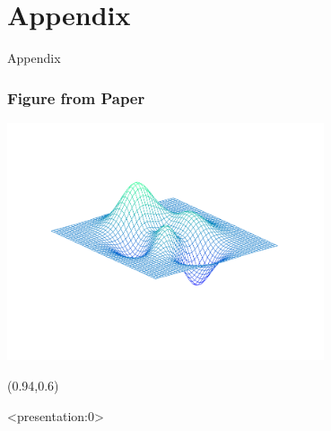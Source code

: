\documentclass[12pt,aspectratio=169,xcolor=dvipsnames,hyperref={colorlinks=true,linkcolor=blue,citecolor=black}]{beamer}
\begin{document}
\section[]{Appendix}

\begin{frame}
	\begin{center}
		\huge \textcolor{yaleblue}{Appendix}
	\end{center}
\end{frame}

\begin{frame}[label=figureex]
	\frametitle{Figure from Paper}
	\begin{center}
		\includegraphics[trim={0cm 0cm 0cm 1cm},clip,height=7cm,width=\textwidth,keepaspectratio]{../Figures/exfigure1}
	\end{center}
	
	\begin{textblock*}{3cm}(0.94\textwidth,0.6\textheight)	%
		\hyperlink{examples}{}
	\end{textblock*}
\end{frame}

\begin{frame}<presentation:0>								%
	\printbibliography
\end{frame}
\end{document}
